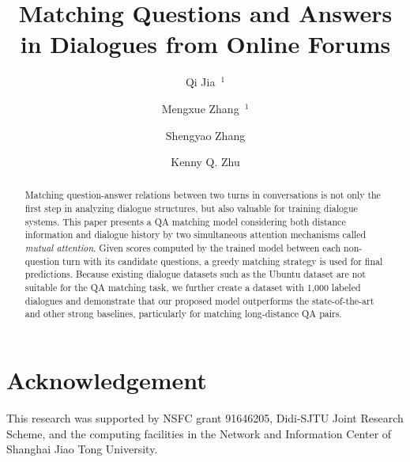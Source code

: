 \documentclass{ecai}
\begin{document}
\title{Matching Questions and Answers in Dialogues from Online Forums}

\author{Qi Jia~$^1$ \and Mengxue Zhang~$^1$  \and 
Shengyao Zhang  \and 
Kenny Q. Zhu }

\maketitle


\begin{abstract}
 Matching question-answer relations between two turns in conversations is not only 
the first step in analyzing dialogue structures, 
but also valuable for training dialogue systems. 
This paper presents a QA matching model considering both 
distance information and dialogue history by two simultaneous attention 
mechanisms called \textit{mutual attention}. 
Given scores computed by the trained model between each non-question 
turn with its candidate questions, a greedy matching strategy 
is used for final predictions. 
Because existing dialogue datasets such as the Ubuntu dataset are not 
suitable for the QA matching task, we further create a dataset with 
1,000 labeled dialogues and 
demonstrate that our proposed model outperforms the state-of-the-art and 
other strong baselines, particularly for
matching long-distance QA pairs.
\end{abstract}



















\section*{Acknowledgement}
This research was supported by NSFC grant 91646205, Didi-SJTU Joint Research Scheme, and the computing facilities in the 
Network and Information Center of Shanghai Jiao Tong University.



\end{document}
